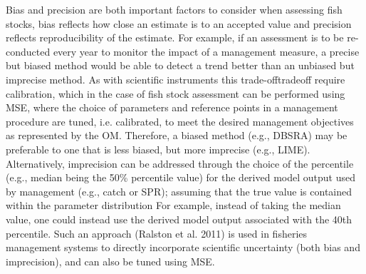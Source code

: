 Bias and precision are both important factors to consider when assessing fish stocks, bias reflects how close an estimate is to an accepted value and precision reflects reproducibility of the estimate. For example, if an assessment is to be re-conducted every year to monitor the impact of a management measure, a precise but biased method would be able to detect a trend better than an unbiased but imprecise method. As with scientific instruments this trade-offtradeoff require calibration, which in the case of fish stock assessment can be performed using MSE, where the choice of parameters and reference points in a management procedure are tuned, i.e. calibrated, to meet the desired management objectives as represented by the OM. Therefore, a biased method (e.g., DBSRA) may be preferable to one that is less biased, but more imprecise (e.g., LIME). Alternatively, imprecision can be addressed through the choice of the percentile (e.g., median being the 50\% percentile value) for the derived model output used by management (e.g., catch or SPR); assuming that the true value is contained within the parameter distribution For example, instead of taking the median value, one could instead use the derived model output associated with the 40th percentile. Such an approach (Ralston et al. 2011) is used in fisheries management systems to directly incorporate scientific uncertainty (both bias and imprecision), and can also be tuned using MSE. 